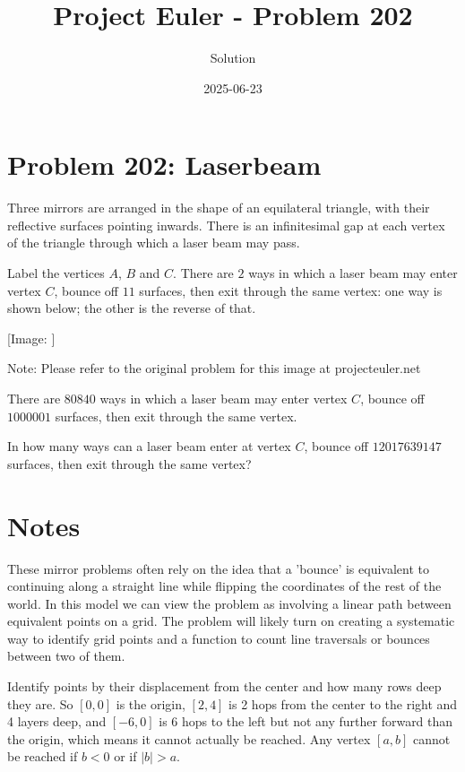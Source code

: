 \documentclass{article}
\title{Project Euler - Problem 202}
\author{Solution}
\date{2025-06-23}
\begin{document}
\maketitle

\section*{Problem 202: Laserbeam}


Three mirrors are arranged in the shape of an equilateral triangle, with their reflective surfaces pointing inwards. There is an infinitesimal gap at each vertex of the triangle through which a laser beam may pass.

\par
Label the vertices $A$, $B$ and $C$. There are $2$ ways in which a laser beam may enter vertex $C$, bounce off $11$ surfaces, then exit through the same vertex: one way is shown below; the other is the reverse of that.

\par
\begin{center}
[Image: ]

\par
Note: Please refer to the original problem for this image at projecteuler.net
\end{center}
There are $80840$ ways in which a laser beam may enter vertex $C$, bounce off $1000001$ surfaces, then exit through the same vertex.

\par
In how many ways can a laser beam enter at vertex $C$, bounce off $12017639147$ surfaces, then exit through the same vertex?

\par


\section*{Notes}

These mirror problems often rely on the idea that a 'bounce' is equivalent to continuing along a straight line while flipping the coordinates of the rest of the world.  In this model we can view the problem as involving a linear path between equivalent points on a grid.  The problem will likely turn on creating a systematic way to identify grid points and a function to count line traversals or bounces between two of them.

\par

Identify points by their displacement from the center and how many rows deep they are.  So $[0, 0]$ is the origin, $[2, 4]$ is 2 hops from the center to the right and 4 layers deep, and $[-6, 0]$ is 6 hops to the left but not any further forward than the origin, which means it cannot actually be reached.  Any vertex $[a, b]$ cannot be reached if $b < 0$ or if $|b| > a$.
\end{document}
